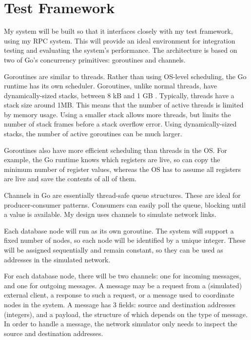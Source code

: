 \documentclass[12pt,a4paper,twoside,openright]{report}
\begin{document}

\section{Test Framework}

My system will be built so that it interfaces closely with my test framework, using my RPC system. This will provide an ideal environment for integration testing and evaluating the system's performance. The architecture is based on two of Go's concurrency primitives: goroutines and channels.

Goroutines are similar to threads. Rather than using OS-level scheduling, the Go runtime has its own scheduler. Goroutines, unlike normal threads, have dynamically-sized stacks, between 8 kB and 1 GB \cite{gosrc}. Typically, threads have a stack size around 1MB. This means that the number of active threads is limited by memory usage. Using a smaller stack allows more threads, but limits the number of stack frames before a stack overflow error. Using dynamically-sized stacks, the number of active goroutines can be much larger.

Goroutines also have more efficient scheduling than threads in the OS. For example, the Go runtime knows which registers are live, so can copy the minimum number of register values, whereas the OS has to assume all registers are live and save the contents of all of them.

Channels in Go are essentially thread-safe queue structures. These are ideal for producer-consumer patterns. Consumers can easily poll the queue, blocking until a value is available. My design uses channels to simulate network links.

Each database node will run as its own goroutine. The system will support a fixed number of nodes, so each node will be identified by a unique integer. These will be assigned sequentially and remain constant, so they can be used as addresses in the simulated network. %

For each database node, there will be two channels: one for incoming messages, and one for outgoing messages. A message may be a request from a (simulated) external client, a response to such a request, or a message used to coordinate nodes in the system. A message has 3 fields: source and destination addresses (integers), and a payload, the structure of which depends on the type of message. In order to handle a message, the network simulator only needs to inspect the source and destination addresses.
\end{document}
